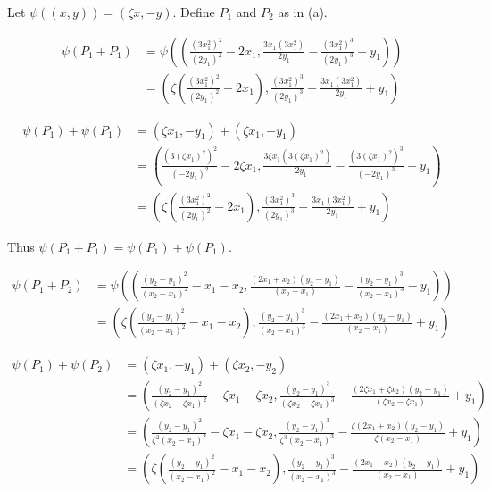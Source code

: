 \documentclass{article}
\begin{document}
Let $\psi((x,y)) = (\zeta x, -y)$. Define $P_1$ and $P_2$ as in (a).

\begin{align*}
\psi(P_1+P_1) &=
\psi \left(
	\left(
		\frac{(3x_1^2)^2}{(2y_1)^2}-2x_1,
		\frac{3x_1(3x_1^2)}{2y_1}-\frac{(3x_1^2)^3}{(2y_1)^3}-y_1
	\right)
\right) \\
&= \left(
	\zeta \left(\frac{(3x_1^2)^2}{(2y_1)^2}-2x_1 \right),
	\frac{(3x_1^2)^3}{(2y_1)^3} - \frac{3x_1(3x_1^2)}{2y_1} + y_1
\right)
\end{align*}

\begin{align*}
\psi(P_1)+\psi(P_1) &= (\zeta x_1,-y_1) + (\zeta x_1,-y_1) \\
&= \left(
	\frac{(3(\zeta x_1)^2)^2}{(-2y_1)^2}-2\zeta x_1,
	\frac{3\zeta x_1(3(\zeta x_1)^2)}{-2y_1}-\frac{(3 (\zeta x_1)^2)^3}{(-2y_1)^3}+y_1
\right) \\
&= \left(
	\zeta \left( \frac{(3x_1^2)^2}{(2y_1)^2}-2x_1 \right),
	\frac{(3x_1^2)^3}{(2y_1)^3} - \frac{3x_1(3x_1^2)}{2y_1} + y_1
\right)
\end{align*}

Thus $\psi(P_1+P_1) = \psi(P_1) + \psi(P_1)$.

\begin{align*}
\psi(P_1+P_2) &= 
\psi \left(
	\left(
		\frac{(y_2-y_1)^2}{(x_2-x_1)^2}-x_1-x_2,
		\frac{(2x_1+x_2)(y_2-y_1)}{(x_2-x_1)}-\frac{(y_2-y_1)^3}{(x_2-x_1)^3}-y_1
	\right)
\right) \\
&= \left(
	\zeta \left(\frac{(y_2-y_1)^2}{(x_2-x_1)^2}-x_1-x_2\right),
	\frac{(y_2-y_1)^3}{(x_2-x_1)^3} - \frac{(2x_1+x_2)(y_2-y_1)}{(x_2-x_1)} + y_1
\right)
\end{align*}

\begin{align*}
\psi(P_1) + \psi(P_2) &= (\zeta x_1, -y_1) + (\zeta x_2, -y_2) \\
&= \left(
	\frac{(y_2-y_1)^2}{(\zeta x_2-\zeta x_1)^2}-\zeta x_1-\zeta x_2,
	\frac{(y_2-y_1)^3}{(\zeta x_2-\zeta x_1)^3} - \frac{(2\zeta x_1+\zeta x_2)(y_2-y_1)}{(\zeta x_2-\zeta x_1)} + y_1
\right)
\\
&=
\left(
	\frac{(y_2-y_1)^2}{\zeta^2(x_2-x_1)^2}-\zeta x_1-\zeta x_2,
	\frac{(y_2-y_1)^3}{\zeta^3(x_2-x_1)^3} - \frac{\zeta(2x_1+x_2)(y_2-y_1)}{\zeta(x_2-x_1)} + y_1
\right) \\
&=
\left(
	\zeta \left( \frac{(y_2-y_1)^2}{(x_2-x_1)^2}-x_1-x_2 \right),
	\frac{(y_2-y_1)^3}{(x_2-x_1)^3} - \frac{(2x_1+x_2)(y_2-y_1)}{(x_2-x_1)} + y_1
\right)
\end{align*}
\end{document}
